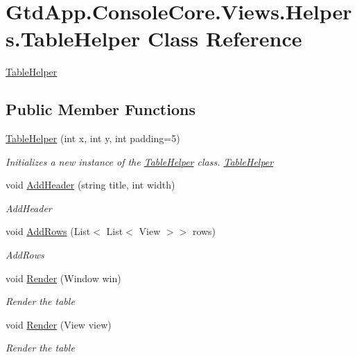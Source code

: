 \hypertarget{class_gtd_app_1_1_console_core_1_1_views_1_1_helpers_1_1_table_helper}{}\section{Gtd\+App.\+Console\+Core.\+Views.\+Helpers.\+Table\+Helper Class Reference}
\label{class_gtd_app_1_1_console_core_1_1_views_1_1_helpers_1_1_table_helper}


\mbox{\hyperlink{class_gtd_app_1_1_console_core_1_1_views_1_1_helpers_1_1_table_helper}{Table\+Helper}}  


\subsection*{Public Member Functions}
\begin{DoxyCompactItemize}
\item 
\mbox{\hyperlink{class_gtd_app_1_1_console_core_1_1_views_1_1_helpers_1_1_table_helper_af50c8ec196e688b6bf75723c3336239a}{Table\+Helper}} (int x, int y, int padding=5)
\begin{DoxyCompactList}\small\item\em Initializes a new instance of the \mbox{\hyperlink{class_gtd_app_1_1_console_core_1_1_views_1_1_helpers_1_1_table_helper}{Table\+Helper}} class. \mbox{\hyperlink{class_gtd_app_1_1_console_core_1_1_views_1_1_helpers_1_1_table_helper}{Table\+Helper}} \end{DoxyCompactList}\item 
void \mbox{\hyperlink{class_gtd_app_1_1_console_core_1_1_views_1_1_helpers_1_1_table_helper_a5bf2dc639abef33b9f681f31f0c14a32}{Add\+Header}} (string title, int width)
\begin{DoxyCompactList}\small\item\em Add\+Header \end{DoxyCompactList}\item 
void \mbox{\hyperlink{class_gtd_app_1_1_console_core_1_1_views_1_1_helpers_1_1_table_helper_a902c913cb19a3c5bf4bc33ae8570868c}{Add\+Rows}} (List$<$ List$<$ View $>$$>$ rows)
\begin{DoxyCompactList}\small\item\em Add\+Rows \end{DoxyCompactList}\item 
void \mbox{\hyperlink{class_gtd_app_1_1_console_core_1_1_views_1_1_helpers_1_1_table_helper_a00a4733a17a6f28e7bac8dbf796ac980}{Render}} (Window win)
\begin{DoxyCompactList}\small\item\em Render the table \end{DoxyCompactList}\item 
void \mbox{\hyperlink{class_gtd_app_1_1_console_core_1_1_views_1_1_helpers_1_1_table_helper_a59d17bcc8e24301c74c4c6e22639d60e}{Render}} (View view)
\begin{DoxyCompactList}\small\item\em Render the table \end{DoxyCompactList}\end{DoxyCompactItemize}
